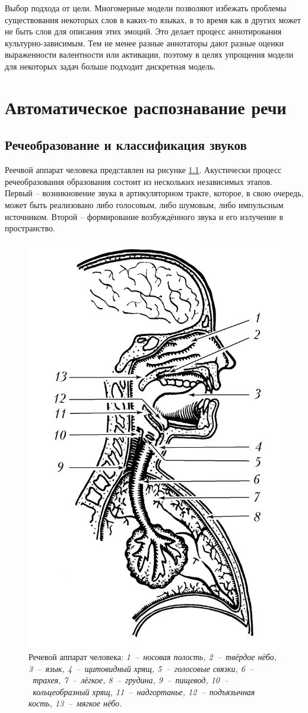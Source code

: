 Выбор подхода от цели. Многомерные модели позволяют избежать проблемы существования  некоторых слов в каких-то языках, в то время как в других может не быть слов для описания этих эмоций. Это делает процесс аннотирования культурно-зависимым. Тем не менее разные аннотаторы дают разные оценки выраженности валентности или активации, поэтому в целях упрощения модели для некоторых задач больше подходит дискретная модель.

\chapter{Автоматическое распознавание речи}
\section{Речеобразование и классификация звуков}
Реечвой аппарат человека представлен на рисунке \ref{fig:voice-anatomy}. Акустически процесс речеобразования образования состоит из нескольких независимых этапов.~\cite{Фант1964} Первый -- возникновение звука в артикуляторном тракте, которое, в свою очередь, может быть реализовано либо голосовым, либо шумовым, либо импульсным источником. Второй -- формирование возбуждённого звука и его излучение в пространство.

\begin{figure}[H]
	\centering
	\includegraphics[width=0.45\linewidth]{assets/voice.jpg}
	\caption{Речевой аппарат человека: \textit{1~--~носовая полость, 2~--~твёрдое нёбо, 3~--~язык, 4~--~щитовидный хрящ, 5~--~голосовые связки, 6~--~трахея, 7~--~лёгкое, 8~--~грудина, 9~--~пищевод, 10~--~кольцеобразный хрящ, 11~--~надгортанье, 12~--~подъязычная кость, 13~--~мягкое нёбо.}}
	\label{fig:voice-anatomy}
\end{figure}

